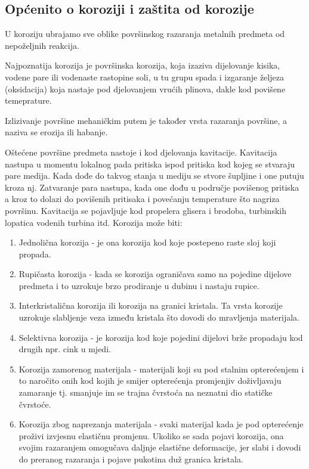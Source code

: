 \documentclass[a4paper,12pt]{article}
\numberwithin{figure}{section}
\begin{document}
\subsection{Općenito o koroziji i zaštita od korozije}
U koroziju ubrajamo sve oblike površinskog razaranja metalnih predmeta od nepoželjnih reakcija.\par
Najpoznatija korozija je površinska korozija, koja izaziva dijelovanje kisika, vodene pare ili vodenaste rastopine soli, u tu grupu spada i izgaranje željeza (oksidacija) koja nastaje pod djelovanjem vrućih plinova, dakle kod povišene temeprature.\par
Izlizivanje površine mehaničkim putem je također vrsta razaranja površine, a naziva se erozija ili habanje.\par
Oštećene površine predmeta nastoje i kod djelovanja kavitacije. Kavitacija nastupa u momentu lokalnog pada pritiska ispod pritiska kod kojeg se stvaraju pare medija. Kada dođe do takvog stanja u mediju se stvore šupljine i one putuju kroza nj. Zatvaranje para nastupa, kada one dođu u područje povišenog pritiska a kroz to dolazi do povišenih pritisaka i povećanju temperature što nagriza površinu. Kavitacija se pojavljuje kod propelera glisera i brodoba, turbinskih lopatica vodenih turbina itd. Korozija može biti:
\begin{enumerate}
\item Jednolična korozija - je ona korozija kod koje postepeno raste sloj koji propada.
\item Rupičasta korozija - kada se korozija ograničava samo na pojedine dijelove predmeta i to uzrokuje brzo prodiranje u dubinu i nastaju rupice.
\item Interkristalična korozija ili korozija na granici kristala. Ta vrsta korozije uzrokuje slabljenje veza između kristala što dovodi do mravljenja materijala.
\item Selektivna korozija - je korozija kod koje pojedini dijelovi brže propadaju kod drugih npr. cink u mjedi.
\item Korozija zamorenog materijala - materijali koji su pod stalnim opterećenjem i to naročito onih kod kojih je smijer opterećenja promjenjiv doživljavaju zamaranje tj. smanjuje im se trajna čvrstoća na neznatni dio statičke čvrstoće.
\item Korozija zbog naprezanja materijala - svaki materijal kada je pod opterećenje proživi izvjesnu elastičnu promjenu. Ukoliko se sada pojavi korozija, ona svojim razaranjem omogučava daljnje elastične deformacije, jer slabi i dovodi do preranog razaranja i pojave pukotina duž granica kristala.
\end{enumerate}
\end{document}
